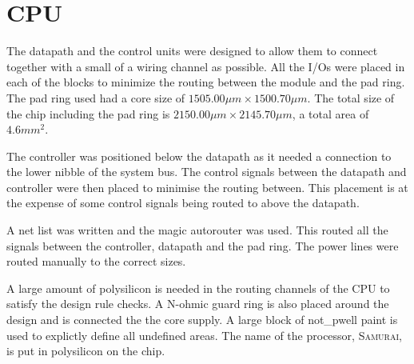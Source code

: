 

\section{CPU}


The datapath and the control units were designed to allow them to connect together with a small of a wiring channel as possible. 
All the I/Os were placed in each of the blocks to minimize the routing between the module and the pad ring. 
The pad ring used had a core size of $1505.00\mu m \times 1500.70\mu m$. 
The total size of the chip including the pad ring is $ 2150.00\mu m \times 2145.70\mu m$, a total area of $4.6mm^2$.

The controller was positioned below the datapath as it needed a connection to the lower nibble of the system bus. 
The control signals between the datapath and controller were then placed to minimise the routing between. 
This placement is at the expense of some control signals being routed to above the datapath. 

A net list was written and the magic autorouter was used.
This routed all the signals between the controller, datapath and the pad ring. 
The power lines were routed manually to the correct sizes. 

A large amount of polysilicon is needed in the routing channels of the CPU to satisfy the design rule checks. 
A N-ohmic guard ring is also placed around the design and is connected the the core supply.
A large block of not_pwell paint is used to explictly define all undefined areas. 
The name of the processor, \textsc{Samurai}, is put in polysilicon on the chip.
